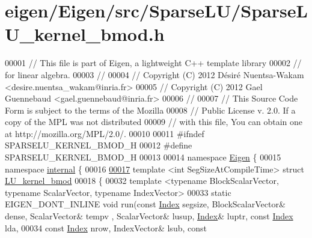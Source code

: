 \hypertarget{eigen_2_eigen_2src_2_sparse_l_u_2_sparse_l_u__kernel__bmod_8h_source}{}\section{eigen/\+Eigen/src/\+Sparse\+L\+U/\+Sparse\+L\+U\+\_\+kernel\+\_\+bmod.h}
\label{eigen_2_eigen_2src_2_sparse_l_u_2_sparse_l_u__kernel__bmod_8h_source}

\begin{DoxyCode}
00001 \textcolor{comment}{// This file is part of Eigen, a lightweight C++ template library}
00002 \textcolor{comment}{// for linear algebra.}
00003 \textcolor{comment}{//}
00004 \textcolor{comment}{// Copyright (C) 2012 Désiré Nuentsa-Wakam <desire.nuentsa\_wakam@inria.fr>}
00005 \textcolor{comment}{// Copyright (C) 2012 Gael Guennebaud <gael.guennebaud@inria.fr>}
00006 \textcolor{comment}{//}
00007 \textcolor{comment}{// This Source Code Form is subject to the terms of the Mozilla}
00008 \textcolor{comment}{// Public License v. 2.0. If a copy of the MPL was not distributed}
00009 \textcolor{comment}{// with this file, You can obtain one at http://mozilla.org/MPL/2.0/.}
00010 
00011 \textcolor{preprocessor}{#ifndef SPARSELU\_KERNEL\_BMOD\_H}
00012 \textcolor{preprocessor}{#define SPARSELU\_KERNEL\_BMOD\_H}
00013 
00014 \textcolor{keyword}{namespace }\hyperlink{namespace_eigen}{Eigen} \{
00015 \textcolor{keyword}{namespace }\hyperlink{namespaceinternal}{internal} \{
00016   
\hyperlink{struct_eigen_1_1internal_1_1_l_u__kernel__bmod}{00017} \textcolor{keyword}{template} <\textcolor{keywordtype}{int} SegSizeAtCompileTime> \textcolor{keyword}{struct }\hyperlink{struct_eigen_1_1internal_1_1_l_u__kernel__bmod}{LU\_kernel\_bmod}
00018 \{
00032   \textcolor{keyword}{template} <\textcolor{keyword}{typename} BlockScalarVector, \textcolor{keyword}{typename} ScalarVector, \textcolor{keyword}{typename} IndexVector>
00033   \textcolor{keyword}{static} EIGEN\_DONT\_INLINE \textcolor{keywordtype}{void} run(\textcolor{keyword}{const} \hyperlink{namespace_eigen_a62e77e0933482dafde8fe197d9a2cfde}{Index} segsize, BlockScalarVector& dense, ScalarVector& tempv
      , ScalarVector& lusup, \hyperlink{namespace_eigen_a62e77e0933482dafde8fe197d9a2cfde}{Index}& luptr, \textcolor{keyword}{const} \hyperlink{namespace_eigen_a62e77e0933482dafde8fe197d9a2cfde}{Index} lda,
00034                                     \textcolor{keyword}{const} \hyperlink{namespace_eigen_a62e77e0933482dafde8fe197d9a2cfde}{Index} nrow, IndexVector& lsub, \textcolor{keyword}{const} 

\end{DoxyCode}
